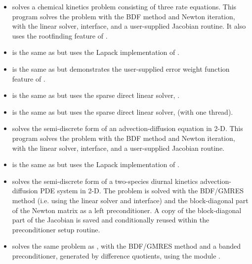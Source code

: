 \begin{itemize}
\item {}
  solves a chemical kinetics problem consisting of three rate equations.
  \newline
  This program solves the problem with the BDF method and Newton          
  iteration, with the {\sunlinsoldense} linear solver, {\cvdls}
  interface, and a user-supplied Jacobian routine.  It also uses the
  rootfinding feature of {\cvode}. 
\item {}
  is the same as  but uses the Lapack
  implementation of {\sunlinsollapdense}. 
\item {}
  is the same as  but demonstrates the user-supplied error
  weight function feature of {\cvode}.
\item {}
  is the same as  but uses the {\klu} sparse direct
  linear solver, {\sunlinsolklu}.
\item {}
  is the same as  but uses the {\superlumt} sparse
  direct linear solver, {\sunlinsolslumt} (with one thread).
\item {}
  solves the semi-discrete form of an advection-diffusion equation in 2-D. 
  \newline
  This program solves the problem with the BDF method and Newton          
  iteration, with the {\sunlinsolband} linear solver, {\cvdls}
  interface, and a user-supplied Jacobian routine.
\item {}
  is the same as  but uses the Lapack
  implementation of {\sunlinsollapband}. 
\item {}
  solves the semi-discrete form of a two-species diurnal kinetics
  advection-diffusion PDE system in 2-D.
  \newline
  The problem is solved with the BDF/GMRES method (i.e.    
  using the {\sunlinsolspgmr} linear solver and {\cvspils} interface)
  and the block-diagonal part of the Newton matrix as a left
  preconditioner. A copy of the block-diagonal part of the Jacobian is
  saved and conditionally reused within the preconditioner setup routine.
\item {}
  solves the same problem as , with the BDF/GMRES method 
  and a banded preconditioner, generated by difference quotients, 
  using the module {\cvbandpre}.
  \newline

\end{itemize}
